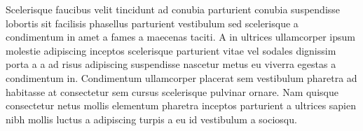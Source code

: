Scelerisque faucibus velit tincidunt ad conubia parturient conubia suspendisse lobortis sit facilisis phasellus parturient vestibulum sed scelerisque a condimentum in amet a fames a maecenas taciti. A in ultrices ullamcorper ipsum molestie adipiscing inceptos scelerisque parturient vitae vel sodales dignissim porta a a ad risus adipiscing suspendisse nascetur metus eu viverra egestas a condimentum in. Condimentum ullamcorper placerat sem vestibulum pharetra ad habitasse at consectetur sem cursus scelerisque pulvinar ornare. Nam quisque consectetur netus mollis elementum pharetra inceptos parturient a ultrices sapien nibh mollis luctus a adipiscing turpis a eu id vestibulum a sociosqu.